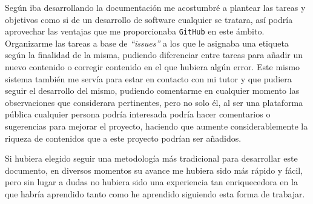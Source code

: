 \bigskip
Según iba desarrollando la documentación me acostumbré a plantear las tareas y objetivos como si de un desarrollo de software cualquier se tratara, así podría aprovechar las ventajas que me proporcionaba {\tt GitHub} en este ámbito. Organizarme las tareas a base de \textit{``issues''} a los que le asignaba una etiqueta según la finalidad de la misma, pudiendo diferenciar entre tareas para añadir un nuevo contenido o corregir contenido en el que hubiera algún error. Este mismo sistema también me servía para estar en contacto con mi tutor y que pudiera seguir el desarrollo del mismo, pudiendo comentarme en cualquier momento las observaciones que considerara pertinentes, pero no solo él, al ser una plataforma pública cualquier persona podría interesada podría hacer comentarios o sugerencias para mejorar el proyecto, haciendo que aumente considerablemente la riqueza de contenidos que a este proyecto podrían ser añadidos.

\bigskip
Si hubiera elegido seguir una metodología más tradicional para desarrollar este documento, en diversos momentos su avance me hubiera sido más rápido y fácil, pero sin lugar a dudas no hubiera sido una experiencia tan enriquecedora en la que habría aprendido tanto como he aprendido siguiendo esta forma de trabajar.